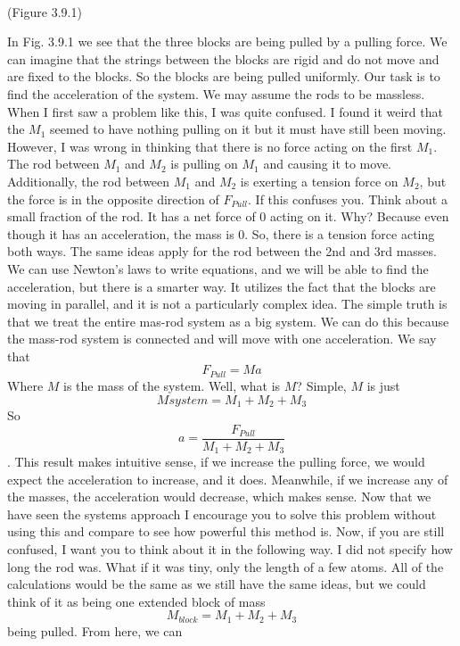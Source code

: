 \documentclass{article}[gray]
\numberwithin{equation}{subsection}
\begin{document}
\
\newline
{}
\newline
\begin{center}
(Figure 3.9.1)
\end{center}
In Fig. 3.9.1 we see that the three blocks are being pulled by a pulling force. We can imagine that the strings between the blocks are rigid and do not move and are fixed to the blocks. So the blocks are being pulled uniformly. Our task is to find the acceleration of the system. We may assume the rods to be massless. When I first saw a problem like this, I was quite confused. I found it weird that the $M_1$ seemed to have nothing pulling on it but it must have still been moving. However, I was wrong in thinking that there is no force acting on the first $M_1$. The rod between $M_1$ and $M_2$ is pulling on $M_1$ and causing it to move. Additionally, the rod between $M_1$ and $M_2$ is exerting a tension force on $M_2$, but the force is in the opposite direction of $F_{Pull}$. If this confuses you. Think about a small fraction of the rod. It has a net force of 0 acting on it. Why? Because even though it has an acceleration, the mass is 0. So, there is a tension force acting both ways. The same ideas apply for the rod between the 2nd and 3rd masses. We can use Newton’s laws to write equations, and we will be able to find the acceleration, but there is a smarter way. It utilizes the fact that the blocks are moving in parallel, and it is not a particularly complex idea. The simple truth is that we treat the entire mas-rod system as a big system. We can do this because the mass-rod system is connected and will move with one acceleration. We say that $$F_{Pull}=Ma$$ Where $M$ is the mass of the system. Well, what is $M$? Simple, $M$ is just $$M{system} = M_1+M_2+M_3$$ So \begin{equation}a=\frac{F_{Pull}}{M_1+M_2+M_3}\end{equation}. This result makes intuitive sense, if we increase the pulling force, we would expect the acceleration to increase, and it does. Meanwhile, if we increase any of the masses, the acceleration would decrease, which makes sense. Now that we have seen the systems approach I encourage you to solve this problem without using this and compare to see how powerful this method is. Now, if you are still confused, I want you to think about it in the following way. I did not specify how long the rod was. What if it was tiny, only the length of a few atoms. All of the calculations would be the same as we still have the same ideas, but we could think of it as being one extended block of mass $$M_{block}=M_1+M_2+M_3$$ being pulled. From here, we can 
\end{document}

